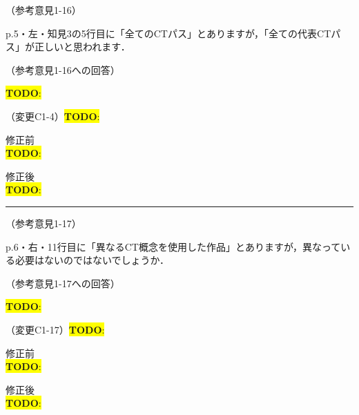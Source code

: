 \documentclass{jarticle} %
\newcommand{\todo}[1]{\colorbox{yellow}{{\bf TODO}:}{\color{blue}{\textbf{[#1]}}}}
\def\subsection#1{ \vspace{1pc} {\gt #1} }
\def\nextans{ \vspace{2pc} \hrule }
\begin{document}
\subsection{（参考意見1-16）}

p.5・左・知見3の5行目に「全てのCTパス」とありますが，「全ての代表CTパス」が正しいと思われます．

\subsection{（参考意見1-16への回答）}

\todo{hoge}

\subsection{（変更C1-4）\todo{hoge}}
\vspace{-0.3cm}
\begin{description}
\item 修正前\\
\phantom{　}
\todo{hoge}
\vspace{-0.3cm}
\item 修正後\\
\phantom{　}
\todo{hoge}
\end{description}

\newpage
\nextans
\subsection{（参考意見1-17）}

p.6・右・11行目に「異なるCT概念を使用した作品」とありますが，異なっている必要はないのではないでしょうか．

\subsection{（参考意見1-17への回答）}

\todo{hoge}

\subsection{（変更C1-17）\todo{hoge}}
\vspace{-0.3cm}
\begin{description}
\item 修正前\\
\phantom{　}
\todo{hoge}
\vspace{-0.3cm}
\item 修正後\\
\phantom{　}
\todo{hoge}
\end{description}
\end{document}
